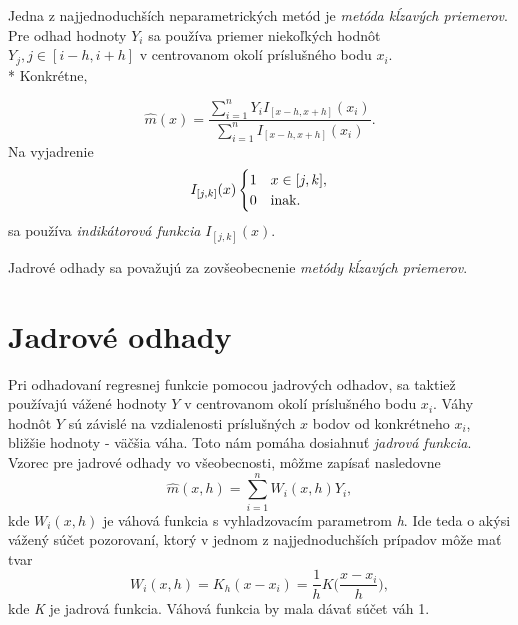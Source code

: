 Jedna z najjednoduchších neparametrických metód je \textit{ metóda kĺzavých priemerov}. Pre odhad hodnoty $Y_i$ sa používa priemer niekoľkých hodnôt $Y_j,  j\in [i-h,i+h]$ v centrovanom okolí príslušného bodu $x_i$. \\*
Konkrétne,
 
\begin{equation}\label{metodaVazenychPriemerov}
\hat{m}(x) = \dfrac{\sum\limits_{i=1}^{n}  Y_i I_{[x - h, x + h]}(x_i)}{\sum\limits_{i=1}^{n} I_{[x - h, x + h]}(x_i)}.
\end{equation}
Na vyjadrenie 
\begin{equation}\label{indikatorovaFunkcia}
I_{[j,k]}(x) \begin{cases}
1 & x \in [j,k], \\ 
0 & $inak.$
\end{cases}
\end{equation}
sa používa \textit{indikátorová funkcia} $I_{[j,k]}(x)$.

Jadrové odhady sa považujú za zovšeobecnenie \textit{metódy kĺzavých priemerov}.


\section{Jadrové odhady}\label{JadroveOdhady}

Pri odhadovaní regresnej funkcie pomocou jadrových odhadov, sa taktiež používajú vážené hodnoty $Y$ v centrovanom okolí príslušného bodu $x_i$. Váhy hodnôt $Y$ sú závislé na vzdialenosti príslušných $x$ bodov od konkrétneho $x_i$, bližšie hodnoty  -  väčšia váha. Toto nám pomáha dosiahnuť \textit{jadrová funkcia}. 
Vzorec pre jadrové odhady vo všeobecnosti, môžme zapísať nasledovne
\begin{equation}
\hat{m}(x,h) = \sum\limits_{i=1}^{n} W_i(x,h)Y_i,
\end{equation}
kde $ W_i(x,h)$ je váhová funkcia s vyhladzovacím parametrom \textit{h}. Ide teda o akýsi vážený súčet pozorovaní, ktorý v jednom z najjednoduchších prípadov môže mať tvar
\begin{equation}\label{vahovaFunkcia}
W_i(x,h) = K_h(x - x_i) = \frac{1}{h}K\Big(\frac{x-x_i}{h}\Big),
\end{equation}
kde \textit{K} je jadrová funkcia. Váhová funkcia by mala dávať súčet váh 1.

